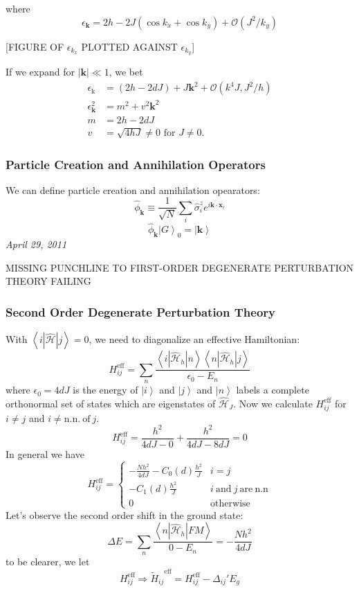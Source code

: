 \documentclass{article}
\newcommand{\me}[3]{\left<#1\left|#2\right|#3\right>}
\newcommand{\ket}[1]{\left|#1\right>}
\begin{document}
	where
	$$\epsilon_{\mathbf{k}}=2h-2J(\cos k_x+\cos k_y)+\mathcal{O}(J^2/k_y)$$
	\begin{center}
	[FIGURE OF $\epsilon_{k_x}$ PLOTTED AGAINST $\epsilon_{k_y}$]
	\end{center}
		If we expand for $\left|\mathbf{k}\right|\ll 1$, we bet
		\begin{align*}
			\epsilon_{\mathrm{k}}&=(2h-2dJ)+J\mathbf{k}^2+\mathcal{O}(k^4J,J^2/h)\\
			\epsilon^2_{\mathbf{k}}&=m^2+v^2\mathbf{k}^2\\
			m&=2h-2dJ\\
			v&=\sqrt{4hJ}\neq 0 \textrm{ for } J\neq 0.
		\end{align*}
	\subsubsection{Particle Creation and Annihilation Operators}
	We can define particle creation and annihilation opearators:
	$$\hat{\phi}_{\mathbf{k}}\equiv \frac{1}{\sqrt{N}}\sum_i\hat{\sigma}_i^ze^{i\mathbf{k}\cdot\mathbf{x}_i}$$
	$$\hat{\phi}_\mathbf{k}\left|G\right>_0=\left|\mathbf{k}\right>$$
	\textit{April 29, 2011}\\
	
	\begin{center} MISSING PUNCHLINE TO FIRST-ORDER DEGENERATE PERTURBATION THEORY FAILING \end{center}
	\subsubsection{Second Order Degenerate Perturbation Theory}
	With $\me{i}{\hat{\mathcal{H}}}{j}=0$, we need to diagonalize an effective Hamiltonian:
	\begin{equation} \label{effHam} H_{ij}^{\mathrm{eff}}=\sum_n \frac{\me{i}{\hat{\mathcal{H}}_h}{n}\me{n}{\hat{\mathcal{H}}_h}{j}}{\epsilon_0-E_n} \end{equation}
	where $\epsilon_0=4dJ$ is the energy of $\ket{i}$ and $\ket{j}$ and $\ket{n}$ labels a complete orthonormal set of states which are eigenstates of $\hat{\mathcal{H}}_J$. Now we calculate $H_{ij}^{\mathrm{eff}}$ for $i\neq j$ and $i\neq \mathrm{n.n.\ of\ }j$.
	$$H_{ij}^{\mathrm{eff}}=\frac{h^2}{4dJ-0}+\frac{h^2}{4dJ-8dJ}=0$$
	In general we have
	$$H_{ij}^{\mathrm{eff}}=\begin{cases} -\frac{Nh^2}{4dJ}-C_0(d)\frac{h^2}{J} & i=j\\
	-C_1(d)\frac{h^2}{J} & i\ \mathrm{and}\ j\ \mathrm{are\ n.n}\\
	0 &\mathrm{otherwise} \end{cases}$$
	Let's observe the second order shift in the ground state:
	$$\Delta E=\sum_n\frac{\me{n}{\hat{\mathcal{H}}_h}{FM}}{0-E_n}=-\frac{Nh^2}{4dJ}$$
	to be clearer, we let
	$$H_{ij}^{\mathrm{eff}}\Rightarrow {\tilde{H}_{ij}}^{\mathrm{eff}}=H_{ij}^{\mathrm{eff}}-\Delta_{ij}'E_g$$
\end{document}
